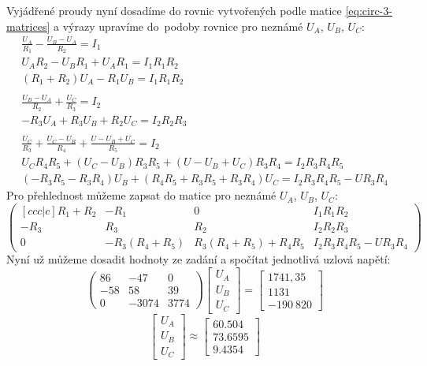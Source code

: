Vyjádřené proudy nyní dosadíme do rovnic vytvořených podle matice \eqref{eq:circ-3-matrices} a výrazy upravíme do~podoby rovnice pro neznámé $U_A$, $U_B$, $U_C$:
\begin{gather*}
    \frac{U_A}{R_1} - \frac{U_B - U_A}{R_2} = I_1 \\
    U_A R_2 - U_B R_1 + U_A R_1 = I_1 R_1 R_2 \\
    (R_1 + R_2) U_A - R_1 U_B = I_1 R_1 R_2 \\
    \\
    \frac{U_B - U_A}{R_2} + \frac{U_C}{R_3} = I_2 \\
    - R_3 U_A + R_3 U_B + R_2 U_C = I_2 R_2 R_3 \\
    \\
    \frac{U_C}{R_3} + \frac{U_C - U_B}{R_4} + \frac{U - U_B + U_C}{R_5} = I_2 \\
    U_C R_4 R_5 + (U_C - U_B) R_3 R_5 + (U - U_B + U_C) R_3 R_4 = I_2 R_3 R_4 R_5 \\
    (-R_3 R_5 - R_3 R_4) U_B + (R_4 R_5 + R_3 R_5 + R_3 R_4) U_C = I_2 R_3 R_4 R_5 - U R_3 R_4
\end{gather*}
Pro přehlednost můžeme zapsat do matice pro neznámé $U_A$, $U_B$, $U_C$:
\begin{equation*}
\begin{pmatrix}[ccc|c]
R_1+R_2 & -R_1           &   0                     & I_1 R_1 R_2 \\
   -R_3 &  R_3           & R_2                     & I_2 R_2 R_3 \\
      0 & -R_3 (R_4+R_5) & R_3 (R_4+R_5) + R_4 R_5 & I_2 R_3 R_4 R_5-U R_3 R_4 
\end{pmatrix}
\end{equation*}
Nyní už můžeme dosadit hodnoty ze zadání a spočítat jednotlivá uzlová napětí:
\[
\begin{pmatrix}
 86 &   -47 &    0 \\
-58 &    58 &   39 \\
  0 & -3074 & 3774
\end{pmatrix}\begin{bmatrix}
U_A \\ U_B \\ U_C
\end{bmatrix} = \begin{bmatrix}
1741{,}35 \\ 1131 \\ -190\ 820
\end{bmatrix}
\]
\[
\begin{bmatrix}
U_A \\ U_B \\ U_C
\end{bmatrix} \approx \begin{bmatrix}
\num{60.504} \\ \num{73.6595} \\ \num{9.4354}
\end{bmatrix}
\]

